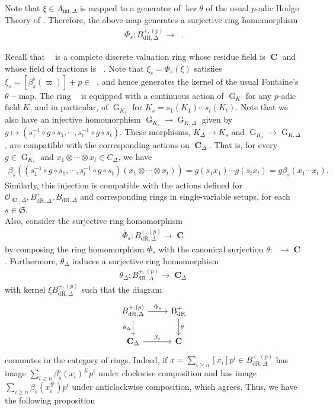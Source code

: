 \documentclass{amsart}
\newcommand{\mAinf}{A_{\mathrm{inf},\Delta}}
\DeclareMathOperator{\Ainf}{A_{inf}}
\DeclareMathOperator{\C}{\textbf{C}}
\DeclareMathOperator{\Bdr}{B_{dR}}
\newcommand{\mBdrp}{B^+_{\mathrm{dR},\Delta}}
\newcommand{\pmBdrp}{B^{+,(p)}_{\mathrm{dR},\Delta}}
\DeclareMathOperator{\Bdrp}{B^+_{dR}}
\newcommand{\mBdr}{B_{\mathrm{dR},\Delta}}
\DeclareMathOperator{\G}{G}
\begin{document}
Note that $\xi\in\mAinf$ is mapped to a generator of $\ker\theta$ of the usual $p$-adic Hodge Theory of \cite{Fontaine}. Therefore, the above map generates a surjective ring homomorphism 
\begin{align*}
    \Phi_s:\pmBdrp\to \Bdrp.
\end{align*}

Recall that $\Bdrp$ is a complete discrete valuation ring whose residue field is $\C$ and whose field of fractions is $\Bdr$. Note that $\xi_s=\Phi_s(\xi)$ satisfies $\xi_s=[\beta^\flat_s(\varpi)]+p\in\Ainf$, and hence generates the kernel of the usual Fontaine's $\theta-$map. The ring $\Bdr$ is equipped with a continuous action of $\G_K$ for any $p$-adic field $K$, and in particular, of $\G_{K_s}$ for $K_s=s_1(K_1)\cdots s_t(K_t)$. Note that we also have an injective homomorphism $\G_{K_s}\to \G_{K,\Delta}$ given by $g\mapsto (s^{-1}_1\circ g\circ s_1,\cdots,s^{-1}_t\circ g\circ s_t)$. These morphisms, $K_\Delta\to K_s$ and $\G_{K_s}\to \G_{K,\Delta}$, are compatible with the corresponding actions on $\C_\Delta$. That is, for every $g\in \G_{K_s}$ and $x_1\otimes\cdots\otimes x_t\in C_\Delta$, we have
\begin{align*}
   \beta_s((s^{-1}_1\circ g\circ s_1,\cdots,s^{-1}_t\circ g\circ s_t)(x_1\otimes\cdots\otimes x_t))=g(s_1 x_1)\cdots g(s_t x_t)=g\beta_s(x_1\cdots x_t).
\end{align*}
Similarly, this injection is compatible with the actions defined for $\mathcal{O}_{\C,\Delta}, \mBdrp, \mBdr$ and corresponding rings in single-variable setups, for each $s\in\mathfrak{S}$.\\

Also, consider the surjective ring homomorphism
\begin{align*}
    \overline{\Phi}_s:\pmBdrp\to \C
\end{align*}
by composing the ring homomorphism $\Phi_s$ with the canonical surjection $\theta:\Bdrp\to \C$. Furthermore, $\theta_\Delta$ induces a surjective ring homomorphism 
\begin{align*}
    \theta_\Delta:\pmBdrp\to\C_\Delta
\end{align*}
with kernel $\xi\pmBdrp$ such that the diagram
\[
\begin{tikzcd}
    \pmBdrp \arrow[r,"\Phi_s"]\arrow[d,swap,"\theta_\Delta"]& \Bdrp\arrow[d,"\theta"] \\
    \C_\Delta \arrow[r,"\beta_s"]     & \C        
\end{tikzcd}
\]
commutes in the category of rings. Indeed, if $x=\sum\limits_{i\geq n}[x_i]p^i\in\pmBdrp$ has image $\sum\limits_{i\geq n}\beta^\flat_s(x_i)^\#p^i$ under clockwise composition and has image $\sum\limits_{i\geq n}\beta_s(x^\#_i)p^i$ under anticlockwise composition, which agrees. Thus, we have the following proposition
\end{document}
